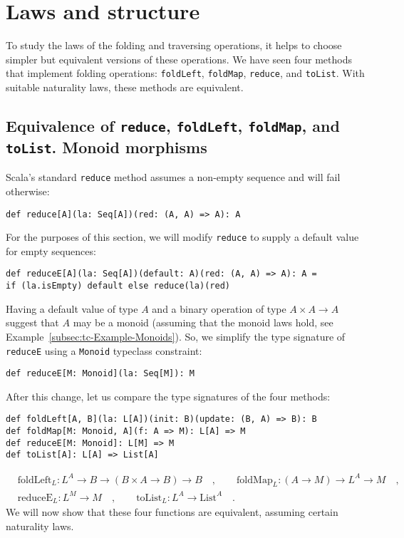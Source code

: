 \section{Laws and structure}

To study the laws of the folding and traversing operations, it helps
to choose simpler but equivalent versions of these operations. We
have seen four methods that implement folding operations: \lstinline!foldLeft!,
\lstinline!foldMap!, \lstinline!reduce!, and \lstinline!toList!.
With suitable naturality laws, these methods are equivalent.

\subsection{Equivalence of \texttt{reduce}, \texttt{foldLeft}, \texttt{foldMap},
and \texttt{toList}. Monoid morphisms\label{subsec:Equivalence-of-foldLeft,foldMap,reduce,and-toList}}

Scala\textsf{'}s standard \lstinline!reduce! method assumes a non-empty sequence
and will fail otherwise:
\begin{lstlisting}
def reduce[A](la: Seq[A])(red: (A, A) => A): A
\end{lstlisting}
For the purposes of this section, we will modify \lstinline!reduce!
to supply a default value for empty sequences:
\begin{lstlisting}
def reduceE[A](la: Seq[A])(default: A)(red: (A, A) => A): A =
if (la.isEmpty) default else reduce(la)(red)
\end{lstlisting}
Having a default value of type $A$ and a binary operation of type
$A\times A\rightarrow A$ suggest that $A$ may be a monoid (assuming
that the monoid laws hold, see Example~\ref{subsec:tc-Example-Monoids}).
So, we simplify the type signature of \lstinline!reduceE! using a
\lstinline!Monoid! typeclass constraint:
\begin{lstlisting}
def reduceE[M: Monoid](la: Seq[M]): M
\end{lstlisting}

After this change, let us compare the type signatures of the four
methods:
\begin{lstlisting}
def foldLeft[A, B](la: L[A])(init: B)(update: (B, A) => B): B
def foldMap[M: Monoid, A](f: A => M): L[A] => M
def reduceE[M: Monoid]: L[M] => M
def toList[A]: L[A] => List[A]
\end{lstlisting}
\begin{align*}
 & \text{foldLeft}_{L}:L^{A}\rightarrow B\rightarrow(B\times A\rightarrow B)\rightarrow B\quad,\quad\quad\text{foldMap}_{L}:(A\rightarrow M)\rightarrow L^{A}\rightarrow M\quad,\\
 & \text{reduceE}_{L}:L^{M}\rightarrow M\quad,\quad\quad\text{toList}_{L}:L^{A}\rightarrow\text{List}^{A}\quad.
\end{align*}
We will now show that these four functions are equivalent, assuming
certain naturality laws.

